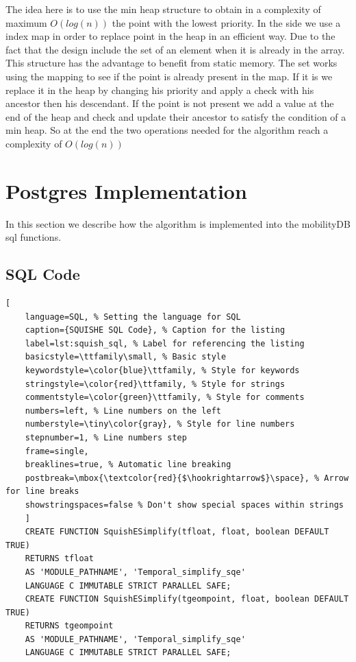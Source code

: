 \documentclass[twoside,12pt, a4paper]{report}
\begin{document}
The idea here is to use the min heap structure to obtain in a complexity of maximum $O(log(n))$  the point with the lowest priority. In the side we use a index map in order to replace point in the heap in an efficient way. Due to the fact that the design include the set of an element when it is already in the array. This structure has the advantage to benefit from static memory. The set works using the mapping to see if the point is already present in the map. If it is we replace it in the heap by changing his priority and apply a check with his ancestor then his descendant. If the point is not present we add a value at the end of the heap and check and update their ancestor to satisfy the condition of a min heap. So at the end the two operations needed for the algorithm reach a complexity of $O(log(n))$ 

\section{Postgres Implementation}

In this section we describe how the algorithm is implemented into the mobilityDB sql functions. 
\subsection{SQL Code}

\begin{lstlisting}[
	language=SQL, % Setting the language for SQL
	caption={SQUISHE SQL Code}, % Caption for the listing
	label=lst:squish_sql, % Label for referencing the listing
	basicstyle=\ttfamily\small, % Basic style
	keywordstyle=\color{blue}\ttfamily, % Style for keywords
	stringstyle=\color{red}\ttfamily, % Style for strings
	commentstyle=\color{green}\ttfamily, % Style for comments
	numbers=left, % Line numbers on the left
	numberstyle=\tiny\color{gray}, % Style for line numbers
	stepnumber=1, % Line numbers step
	frame=single,
	breaklines=true, % Automatic line breaking
	postbreak=\mbox{\textcolor{red}{$\hookrightarrow$}\space}, % Arrow for line breaks
	showstringspaces=false % Don't show special spaces within strings
	]
	CREATE FUNCTION SquishESimplify(tfloat, float, boolean DEFAULT TRUE)
	RETURNS tfloat
	AS 'MODULE_PATHNAME', 'Temporal_simplify_sqe'
	LANGUAGE C IMMUTABLE STRICT PARALLEL SAFE;
	CREATE FUNCTION SquishESimplify(tgeompoint, float, boolean DEFAULT TRUE)
	RETURNS tgeompoint
	AS 'MODULE_PATHNAME', 'Temporal_simplify_sqe'
	LANGUAGE C IMMUTABLE STRICT PARALLEL SAFE;
\end{lstlisting}
\end{document}
